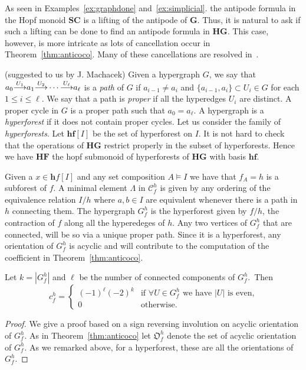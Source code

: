 \documentclass[ALCO,ThmDefs,Unicode,epreuves]{cedram}
\newcommand{\bG}{\mathbf{G}}
\begin{document}
\begin{rema} \label{ex:Hyper}
As seen in Examples~\ref{ex:graphdone} and~\ref{ex:simplicial}. the antipode formula in the Hopf monoid $\mathbf{SC}$ is a lifting of the antipode of $\bG$. Thus, it is natural to ask if such a lifting can be done to find an antipode formula in $\mathbf{HG}$. This case, however, is more intricate as lots of cancellation occur in Theorem~\ref{thm:anticoco}. Many of these cancellations are resolved 
in~\cite{BenedettiHallamMachacek}.
\end{rema}


\begin{exam} \label{ex:Hypertree} (suggested to us by J. Machacek)
Given a hypergraph $G$, we say that $a_0{\buildrel U_1\over \longrightarrow}a_1{\buildrel U_2\over \longrightarrow}\cdots
{\buildrel U_\ell\over \longrightarrow}a_\ell$ is a \emph{path} of $G$ if $a_{i-1}\ne a_i$ and $\{a_{i-1},a_{i}\}\subset U_i\in G$ for each $1\le i\le \ell$.
We say that a path is \emph{proper} if all the hyperedges $U_i$ are distinct.
A proper cycle in $G$ is a proper path such that $a_0=a_\ell$.
A hypergraph is a \emph{hyperforest} if it does not contain proper cycles. 
Let us consider the family of \emph{hyperforests}.
Let $\mathbf{hf}[I]$ be the set of hyperforest on $I$.
It is not hard to check that the operations of $\mathbf{HG}$ restrict properly in the subset of hyperforests.
Hence we have $\mathbf{HF}$ the hopf submonoid of hyperforests of $\mathbf{HG}$ with basis $\mathbf{hf}$.

Given a $x\in{\mathbf hf}[I]$ and any set composition $A\models I$ we have that $f_A=h$ is a subforest of $f$.
A minimal element $\Lambda$ in $\mathcal{C}_f^h$ is given by any ordering of the equivalence relation $I/h$ where $a,b\in I$ are equivalent whenever there is a path in $h$ connecting them. 
The hypergraph $G_f^h$ is the hyperforest given by $f/h$, the contraction of $f$ along all the hyperedeges of $h$. 
Any two vertices of $G_f^h$ that are connected, will be so via a unique proper path.
Since it is a hyperforest, any orientation of $G_f^h$ is acyclic and will contribute to the computation of the coefficient in Theorem~\ref{thm:anticoco}.
\begin{prop} Let $k=|G_f^h|$ and $\ell$ be the number of connected components of $G_f^h$.~Then
 $$c_f^h = \begin{cases} 
 (-1)^\ell (-2)^k& \text{if $\forall U\in G_f^h$ we have $|U|$ is even,}
 \\
 0& \text{otherwise.}
 \end{cases}
 $$
\end{prop}
\begin{proof} We give a proof based on a sign reversing involution on acyclic orientation of $G_f^h$. As in Theorem~\ref{thm:anticoco} let $\mathfrak{O}_f^h$ denote the set of acyclic orientation of $G_f^h$. As we remarked above, for a hyperforest, these are all the orientations of $G_f^h$. 


\end{proof}
\end{exam}
\end{document}
